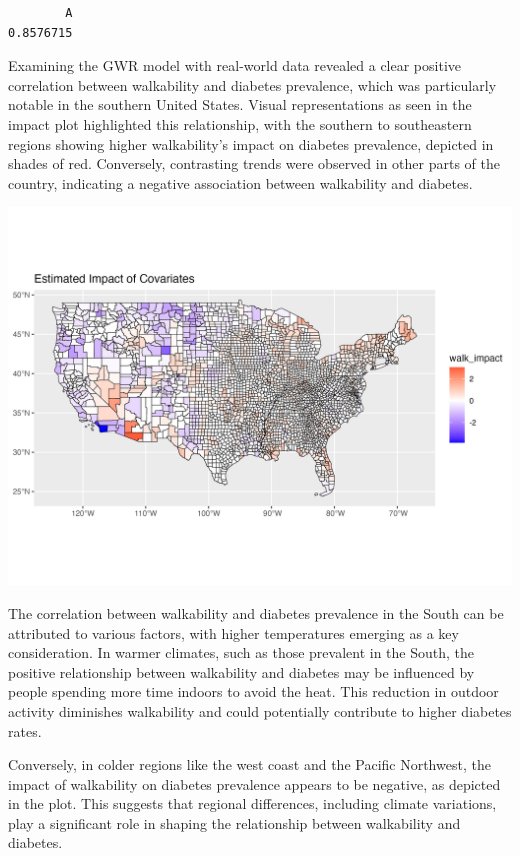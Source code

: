 \documentclass[
]{article}
\begin{document}
\begin{verbatim}
        A 
0.8576715 
\end{verbatim}

Examining the GWR model with real-world data revealed a clear positive
correlation between walkability and diabetes prevalence, which was
particularly notable in the southern United States. Visual
representations as seen in the impact plot highlighted this
relationship, with the southern to southeastern regions showing higher
walkability's impact on diabetes prevalence, depicted in shades of red.
Conversely, contrasting trends were observed in other parts of the
country, indicating a negative association between walkability and
diabetes.

\begin{center}
\includegraphics{impact_plot.png}
\end{center}

The correlation between walkability and diabetes prevalence in the South
can be attributed to various factors, with higher temperatures emerging
as a key consideration. In warmer climates, such as those prevalent in
the South, the positive relationship between walkability and diabetes
may be influenced by people spending more time indoors to avoid the
heat. This reduction in outdoor activity diminishes walkability and
could potentially contribute to higher diabetes rates.

Conversely, in colder regions like the west coast and the Pacific
Northwest, the impact of walkability on diabetes prevalence appears to
be negative, as depicted in the plot. This suggests that regional
differences, including climate variations, play a significant role in
shaping the relationship between walkability and diabetes.
\end{document}
